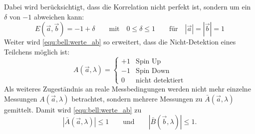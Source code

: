 \begin{refsection}
Dabei wird ber\"ucksichtigt, dass die Korrelation nicht perfekt ist, sondern
um ein $\delta$ von $-1$ abweichen kann:
\begin{equation}
    E(\vec{a},\vec{b}) = -1 + \delta 
    \qquad \text{mit} \quad  0 \leq \delta \leq 1     
    \qquad \text{f\"ur} \quad |\vec{a}| = |\vec{b}| = 1
\end{equation}
Weiter wird \eqref{equ:bell:werte_ab} so erweitert, dass die Nicht-Detektion
eines Teilchens m\"oglich ist:
\begin{equation}
    A(\vec{a},\lambda) = \begin{cases}
        +1 & \text{Spin Up} \\
        -1 & \text{Spin Down} \\
        0 & \text{nicht detektiert}
    \end{cases}
\end{equation}
Als weiteres Zugest\"andnis an reale Messbedingungen werden nicht mehr einzelne
Messungen $A(\vec{a},\lambda)$ betrachtet, sondern mehrere Messungen zu
$\bar{A}(\vec{a},\lambda)$ gemittelt.
Damit wird \eqref{equ:bell:werte_ab} zu
\begin{equation*}
    \left| \bar{A}(\vec{a},\lambda) \right| \leq 1
    \qquad \text{und} \qquad 
    \left| \bar{B}(\vec{b},\lambda) \right| \leq 1.
\end{equation*}


\end{refsection}
